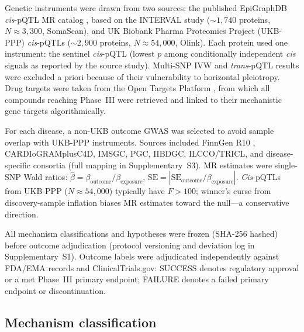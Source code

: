 \documentclass[11pt]{article}
\begin{document}
Genetic instruments were drawn from two sources: the published EpiGraphDB \emph{cis}-pQTL MR catalog \cite{zheng2020phenome}, based on the INTERVAL study \cite{sun2018interval} (${\sim}1{,}740$ proteins, $N \approx 3{,}300$, SomaScan), and UK Biobank Pharma Proteomics Project (UKB-PPP) \emph{cis}-pQTLs \cite{sun2023ukbppp} (${\sim}2{,}900$ proteins, $N \approx 54{,}000$, Olink). Each protein used one instrument: the sentinel \emph{cis}-pQTL (lowest $p$ among conditionally independent \emph{cis} signals as reported by the source study). Multi-SNP IVW \cite{burgess2013ivw} and \emph{trans}-pQTL results were excluded a priori because of their vulnerability to horizontal pleiotropy. Drug targets were taken from the Open Targets Platform \cite{ochoa2021opentargets}, from which all compounds reaching Phase~III were retrieved and linked to their mechanistic gene targets algorithmically.

For each disease, a non-UKB outcome GWAS was selected to avoid sample overlap with UKB-PPP instruments. Sources included FinnGen R10 \cite{kurki2023finngen}, CARDIoGRAMplusC4D, IMSGC, PGC, IIBDGC, ILCCO/TRICL, and disease-specific consortia (full mapping in Supplementary~S3). MR estimates were single-SNP Wald ratios: $\hat{\beta} = \beta_{\text{outcome}} / \beta_{\text{exposure}}$, $\text{SE} = |\text{SE}_{\text{outcome}} / \beta_{\text{exposure}}|$. \emph{Cis}-pQTLs from UKB-PPP ($N \approx 54{,}000$) typically have $F > 100$; winner's curse from discovery-sample inflation \cite{burgess2011weak} biases MR estimates toward the null---a conservative direction.

All mechanism classifications and hypotheses were frozen (SHA-256 hashed) before outcome adjudication (protocol versioning and deviation log in Supplementary~S1). Outcome labels were adjudicated independently against FDA/EMA records and ClinicalTrials.gov: SUCCESS denotes regulatory approval or a met Phase~III primary endpoint; FAILURE denotes a failed primary endpoint or discontinuation.

\subsection{Mechanism classification}
\end{document}
